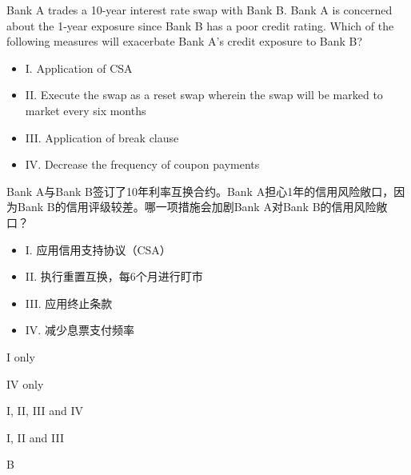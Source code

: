 \documentclass{article}
\newcounter{question} %
\begin{document}
\begin{question}
    Bank A trades a 10-year interest rate swap with Bank B. Bank A is concerned about the 1-year exposure since Bank B has a poor credit rating. Which of the following measures will exacerbate Bank A's credit exposure to Bank B?
    \begin{itemize}
    \item I. Application of CSA
    \item II. Execute the swap as a reset swap wherein the swap will be marked to market every six months
    \item III. Application of break clause
    \item IV. Decrease the frequency of coupon payments
    \end{itemize}
     Bank A与Bank B签订了10年利率互换合约。Bank A担心1年的信用风险敞口，因为Bank B的信用评级较差。哪一项措施会加剧Bank A对Bank B的信用风险敞口？
     \begin{itemize}
    \item I. 应用信用支持协议（CSA）
    \item II. 执行重置互换，每6个月进行盯市
    \item III. 应用终止条款
    \item IV. 减少息票支付频率
    \end{itemize}
\end{question}

\begin{choices}
    \item I only
    \item IV only
    \item I, II, III and IV
    \item I, II and III
\end{choices}

\begin{correctanswer}
    B
\end{correctanswer}
\end{document}

